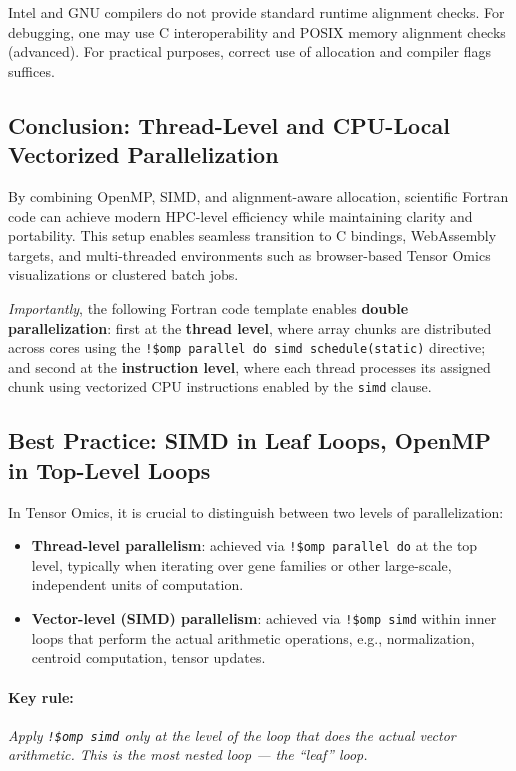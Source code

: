 \documentclass{article}
\begin{document}
Intel and GNU compilers do not provide standard runtime alignment checks. For
debugging, one may use C interoperability and POSIX memory alignment checks
(advanced). For practical purposes, correct use of allocation and compiler
flags suffices.

\subsection{Conclusion: Thread-Level and CPU-Local Vectorized Parallelization}

By combining OpenMP, SIMD, and alignment-aware allocation, scientific Fortran code can achieve modern HPC-level efficiency while maintaining clarity and portability. This setup enables seamless transition to C bindings, WebAssembly targets, and multi-threaded environments such as browser-based Tensor Omics visualizations or clustered batch jobs.

\emph{Importantly}, the following Fortran code template enables \textbf{double parallelization}: first at the \textbf{thread level}, where array chunks are distributed across cores using the \texttt{!\$omp parallel do simd schedule(static)} directive; and second at the \textbf{instruction level}, where each thread processes its assigned chunk using vectorized CPU instructions enabled by the \texttt{simd} clause.

\subsection{Best Practice: SIMD in Leaf Loops, OpenMP in Top-Level Loops}

In Tensor Omics, it is crucial to distinguish between two levels of parallelization:

\begin{itemize}
\item \textbf{Thread-level parallelism}: achieved via \texttt{!\$omp parallel do} at the top level, typically when iterating over gene families or other large-scale, independent units of computation.
\item \textbf{Vector-level (SIMD) parallelism}: achieved via \texttt{!\$omp simd} within inner loops that perform the actual arithmetic operations, e.g., normalization, centroid computation, tensor updates.
\end{itemize}

\paragraph{Key rule:} \emph{Apply \texttt{!\$omp simd} only at the level of the loop that does the actual vector arithmetic. This is the most nested loop — the ``leaf'' loop.}
\end{document}
